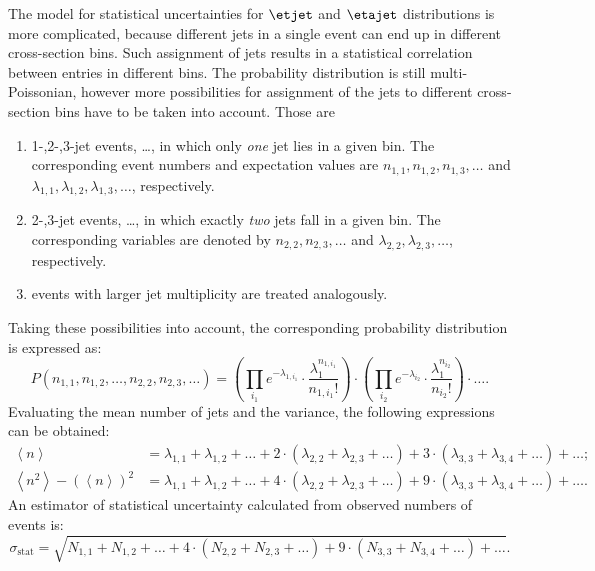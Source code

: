 The model for statistical uncertainties for $\etjet$ and $\etajet$ distributions is more complicated, because different jets in a single event can end up in different cross-section bins. Such assignment of jets results in a statistical correlation between entries in different bins. The probability distribution is still multi-Poissonian, however more possibilities for assignment of the jets to different cross-section bins have to be taken into account. Those are
 \begin{enumerate}
  \item 1-,2-,3-jet events, \ldots, in which only \textit{one} jet lies in a given bin. The corresponding event numbers and expectation values are $n_{1,1}, n_{1,2}, n_{1,3}, \ldots$ and $\lambda_{1,1}, \lambda_{1,2}, \lambda_{1,3}, \ldots$, respectively.
  \item 2-,3-jet events, \ldots, in which exactly \textit{two} jets fall in a given bin. The corresponding variables are denoted by $n_{2,2}, n_{2,3}, \ldots$ and $\lambda_{2,2}, \lambda_{2,3}, \ldots$, respectively.
  \item events with larger jet multiplicity are treated analogously.
 \end{enumerate}
Taking these possibilities into account, the corresponding probability distribution is expressed as:
\begin{equation}
P\left(n_{1,1}, n_{1,2},\ldots, n_{2,2}, n_{2,3}, \ldots \right) = \left( \prod_{i_1}{ e^{-\lambda_{1,i_1}} \cdot \frac{\lambda_1^{n_{1,{i_1}}}}{n_{1,{i_1}}!} } \right) \cdot \left( \prod_{i_2}{ e^{-\lambda_{i_2} } \cdot \frac{\lambda_1^{n_{i_2}}}{n_{i_2}!} } \right) \cdot \ldots.
\label{eq:multipoissonqsq}
\end{equation}
Evaluating the mean number of jets and the variance, the following expressions can be obtained:
\begin{align}
 \left\langle n \right\rangle &= \lambda_{1,1} + \lambda_{1,2} + \ldots + 2\cdot\left(\lambda_{2,2}+\lambda_{2,3}+\ldots\right) + 3\cdot\left( \lambda_{3,3} + \lambda_{3,4} + \ldots \right) + \ldots;\\
 \left\langle n^2 \right \rangle - \left( \left\langle n \right \rangle \right)^2 &= \lambda_{1,1} + \lambda_{1,2} + \ldots + 4\cdot\left(\lambda_{2,2}+\lambda_{2,3}+\ldots\right) + 9\cdot\left( \lambda_{3,3} + \lambda_{3,4} + \ldots \right) + \ldots. 
\end{align} 
An estimator of statistical uncertainty calculated from observed numbers of events is:
\begin{equation}
 \sigma_\text{stat} = \sqrt{ N_{1,1} + N_{1,2} + \ldots + 4\cdot\left(N_{2,2}+N_{2,3}+\ldots\right) + 9\cdot\left( N_{3,3} + N_{3,4} + \ldots \right) + \ldots}.
\end{equation}

